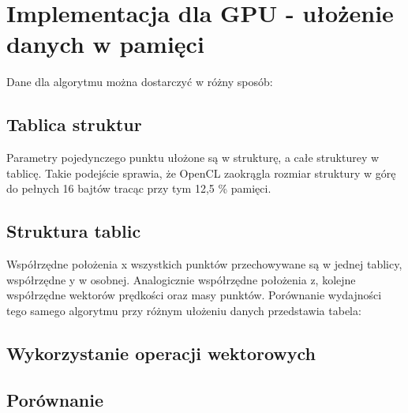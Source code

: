 
\section { Implementacja dla GPU - ułożenie danych w pamięci }
Dane dla algorytmu można dostarczyć w różny sposób:
\subsection { Tablica struktur }
Parametry pojedynczego punktu ułożone są w strukturę, a całe strukturey w tablicę. Takie podejście sprawia, że OpenCL zaokrągla rozmiar struktury w górę do pełnych 16 bajtów tracąc przy tym 12,5 \% pamięci.
\subsection { Struktura tablic }
Współrzędne położenia x wszystkich punktów przechowywane są w jednej tablicy, współrzędne y w osobnej. Analogicznie współrzędne położenia z, kolejne współrzędne wektorów prędkości oraz masy punktów. 
Porównanie wydajności tego samego algorytmu przy różnym ułożeniu danych przedstawia tabela:

\subsection {Wykorzystanie operacji wektorowych}

\subsection { Porównanie }
